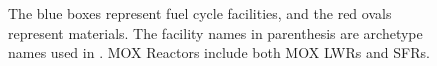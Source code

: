 \begin{figure}
{\begin{tikzpicture}[align=center, node distance = 3cm and 3cm, auto]
                \end{tikzpicture}
        
                }
                \caption{The blue boxes represent fuel cycle facilities, and the red ovals
	                	 represent materials. The facility names in parenthesis are archetype names
	                	 used in \Cyclus. \gls{MOX} Reactors include both \gls{MOX} \glspl{LWR} and
	                	 \glspl{SFR}.}
                \label{diag:fc}
\end{figure}
